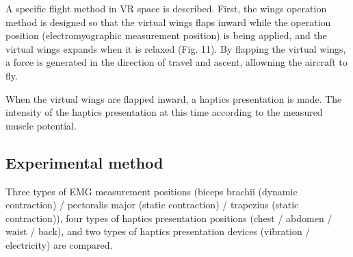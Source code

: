 \documentclass[letterpaper, 10 pt, conference]{ieeeconf}  %
\begin{document}
                
                A specific flight method in VR space is described.  
                First, the wings operation method is designed so that the virtual wings flaps inward while the operation position (electromyographic measurement position) is being applied, and the virtual wings expands when it is relaxed (Fig. 11).  
                By flapping the virtual wings, a force 
                is generated in the direction of travel and ascent, allowning the aircraft to fly.  

                When the virtual wings are flapped inward, a haptics presentation is made.  
                The intensity of the haptics presentation at this time 
                according to the measured muscle potential.  

        
        \subsection{Experimental method}
                Three types of EMG measurement positions (biceps brachii (dynamic contraction) / pectoralis major (static contraction) / trapezius (static contraction)), four types of haptics presentation positions (chest / abdomen / waist / back), and two types of haptics presentation devices (vibration / electricity) are compared.  
                
\end{document}
